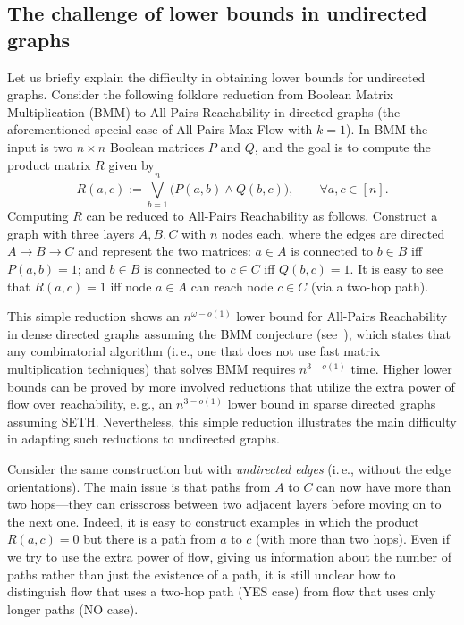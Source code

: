 \documentclass[11pt]{article}
\numberwithin{equation}{section}
\theoremstyle{definition}
\theoremstyle{plain}
\newcommand{\ie}{i.\,e.}
\newcommand{\eg}{e.\,g.}
\theoremstyle{plain}
\newcommand{\ProblemName}[1]{\textsf{#1}}
\newcommand{\SETH}{SETH\xspace}
\newcommand{\APMF}{\ProblemName{All-Pairs Max-Flow}\xspace}
\newcommand{\APR}{\ProblemName{All-Pairs Reachability}\xspace}
\begin{document}
\subsection{The challenge of lower bounds in undirected graphs}
Let us briefly explain the difficulty in obtaining lower bounds for undirected graphs.
Consider the following folklore reduction from Boolean Matrix Multiplication (BMM) to \APR in directed graphs
(the aforementioned special case of \APMF with $k=1$).
In BMM the input is two $n\times n$ Boolean matrices $P$ and $Q$,
and the goal is to compute the product matrix $R$ given by
%
\[
  R(a,c) := \bigvee_{b=1}^n \big( P(a,b) \wedge Q(b,c) \big),
  \qquad
  \forall a,c \in [n].
\]
Computing $R$ can be reduced to \APR as follows.
Construct a graph with three layers $A,B,C$ with $n$ nodes each,
where the edges are directed $A \to B \to C$ and represent the two matrices:
$a \in A$ is connected to $b \in B$ iff $P(a,b) =1$;
and $b \in B$ is connected to $c \in C$ iff $Q(b,c)=1$.
It is easy to see that $R(a,c)=1$ iff node $a \in A$ can reach node $c \in C$ (via a two-hop path).

This simple reduction shows an $n^{\omega-o(1)}$ lower bound for \APR
in dense directed graphs assuming the BMM conjecture (see~\cite{AW14}), which states that any combinatorial algorithm (\ie, one that does not use fast matrix multiplication techniques) that solves BMM requires $n^{3-o(1)}$ time.
Higher lower bounds can be proved by more involved reductions
that utilize the extra power of flow over reachability,
\eg, an $n^{3-o(1)}$ lower bound in sparse directed graphs assuming \SETH \cite{KT18}.
Nevertheless, this simple reduction illustrates the main difficulty
in adapting such reductions to undirected graphs.

Consider the same construction but with \emph{undirected edges}
(\ie, without the edge orientations).
The main issue is that paths from $A$ to $C$ can now have more than two hops---they can crisscross between two adjacent layers before moving on to the next one.
Indeed, it is easy to construct examples in which the product $R(a,c)=0$ but there is a path from $a$ to $c$ (with more than two hops).
Even if we try to use the extra power of flow, giving us information about the number of paths rather than just the existence of a path, it is still unclear how to distinguish flow that uses a two-hop path (YES case) from flow that uses only longer paths (NO case).
\end{document}
